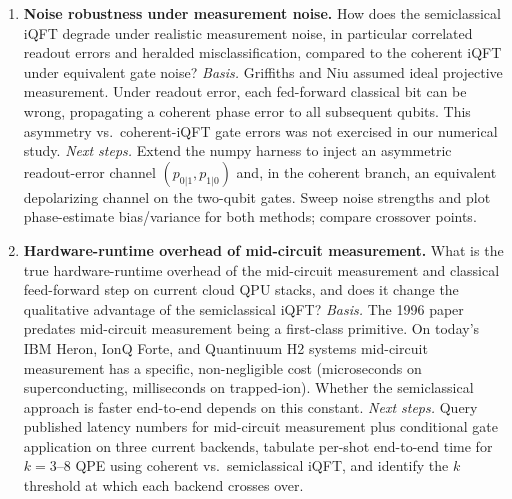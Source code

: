 \begin{enumerate}
\item \textbf{Noise robustness under measurement noise.}
How does the semiclassical iQFT degrade under realistic measurement noise,
in particular correlated readout errors and heralded misclassification,
compared to the coherent iQFT under equivalent gate noise?
\emph{Basis.} Griffiths and Niu assumed ideal projective measurement.
Under readout error, each fed-forward classical bit can be wrong,
propagating a coherent phase error to all subsequent qubits. This
asymmetry vs.\ coherent-iQFT gate errors was not exercised in our numerical
study.
\emph{Next steps.} Extend the numpy harness to inject an asymmetric
readout-error channel $(p_{0|1}, p_{1|0})$ and, in the coherent branch, an
equivalent depolarizing channel on the two-qubit gates. Sweep noise
strengths and plot phase-estimate bias/variance for both methods; compare
crossover points.

\item \textbf{Hardware-runtime overhead of mid-circuit measurement.}
What is the true hardware-runtime overhead of the mid-circuit measurement
and classical feed-forward step on current cloud QPU stacks, and does it
change the qualitative advantage of the semiclassical iQFT?
\emph{Basis.} The 1996 paper predates mid-circuit measurement being a
first-class primitive. On today's IBM Heron, IonQ Forte, and Quantinuum
H2 systems mid-circuit measurement has a specific, non-negligible cost
(microseconds on superconducting, milliseconds on trapped-ion). Whether
the semiclassical approach is faster end-to-end depends on this constant.
\emph{Next steps.} Query published latency numbers for mid-circuit
measurement plus conditional gate application on three current backends,
tabulate per-shot end-to-end time for $k=3\text{--}8$ QPE using coherent
vs.\ semiclassical iQFT, and identify the $k$ threshold at which each
backend crosses over.
\end{enumerate}
